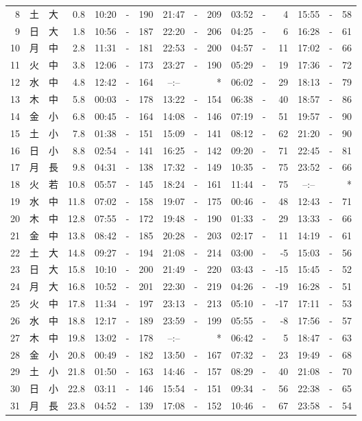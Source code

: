 \documentclass[12pt.a4j]{jsarticle}
\begin{document}
\begin{center}
\begin{table}[ht]
\begin{tabular}{|rc|cr|ccrccr|ccrccr|}
 8 & 土 & 大 &  0.8 & 10:20 &-& 190 & 21:47 &-& 209 & 03:52 &-&   4 & 15:55 &-&  58 \\
 9 & 日 & 大 &  1.8 & 10:56 &-& 187 & 22:20 &-& 206 & 04:25 &-&   6 & 16:28 &-&  61 \\
10 & 月 & 中 &  2.8 & 11:31 &-& 181 & 22:53 &-& 200 & 04:57 &-&  11 & 17:02 &-&  66 \\
11 & 火 & 中 &  3.8 & 12:06 &-& 173 & 23:27 &-& 190 & 05:29 &-&  19 & 17:36 &-&  72 \\
12 & 水 & 中 &  4.8 & 12:42 &-& 164 & --:-- & &  *  & 06:02 &-&  29 & 18:13 &-&  79 \\
13 & 木 & 中 &  5.8 & 00:03 &-& 178 & 13:22 &-& 154 & 06:38 &-&  40 & 18:57 &-&  86 \\
14 & 金 & 小 &  6.8 & 00:45 &-& 164 & 14:08 &-& 146 & 07:19 &-&  51 & 19:57 &-&  90 \\
15 & 土 & 小 &  7.8 & 01:38 &-& 151 & 15:09 &-& 141 & 08:12 &-&  62 & 21:20 &-&  90 \\
16 & 日 & 小 &  8.8 & 02:54 &-& 141 & 16:25 &-& 142 & 09:20 &-&  71 & 22:45 &-&  81 \\
17 & 月 & 長 &  9.8 & 04:31 &-& 138 & 17:32 &-& 149 & 10:35 &-&  75 & 23:52 &-&  66 \\
18 & 火 & 若 & 10.8 & 05:57 &-& 145 & 18:24 &-& 161 & 11:44 &-&  75 & --:-- & &  *  \\
19 & 水 & 中 & 11.8 & 07:02 &-& 158 & 19:07 &-& 175 & 00:46 &-&  48 & 12:43 &-&  71 \\
20 & 木 & 中 & 12.8 & 07:55 &-& 172 & 19:48 &-& 190 & 01:33 &-&  29 & 13:33 &-&  66 \\
21 & 金 & 中 & 13.8 & 08:42 &-& 185 & 20:28 &-& 203 & 02:17 &-&  11 & 14:19 &-&  61 \\
22 & 土 & 大 & 14.8 & 09:27 &-& 194 & 21:08 &-& 214 & 03:00 &-&  -5 & 15:03 &-&  56 \\
23 & 日 & 大 & 15.8 & 10:10 &-& 200 & 21:49 &-& 220 & 03:43 &-& -15 & 15:45 &-&  52 \\
24 & 月 & 大 & 16.8 & 10:52 &-& 201 & 22:30 &-& 219 & 04:26 &-& -19 & 16:28 &-&  51 \\
25 & 火 & 中 & 17.8 & 11:34 &-& 197 & 23:13 &-& 213 & 05:10 &-& -17 & 17:11 &-&  53 \\
26 & 水 & 中 & 18.8 & 12:17 &-& 189 & 23:59 &-& 199 & 05:55 &-&  -8 & 17:56 &-&  57 \\
27 & 木 & 中 & 19.8 & 13:02 &-& 178 & --:-- & &  *  & 06:42 &-&   5 & 18:47 &-&  63 \\
28 & 金 & 小 & 20.8 & 00:49 &-& 182 & 13:50 &-& 167 & 07:32 &-&  23 & 19:49 &-&  68 \\
29 & 土 & 小 & 21.8 & 01:50 &-& 163 & 14:46 &-& 157 & 08:29 &-&  40 & 21:08 &-&  70 \\
30 & 日 & 小 & 22.8 & 03:11 &-& 146 & 15:54 &-& 151 & 09:34 &-&  56 & 22:38 &-&  65 \\
31 & 月 & 長 & 23.8 & 04:52 &-& 139 & 17:08 &-& 152 & 10:46 &-&  67 & 23:58 &-&  54 \\
\hline
\end{tabular}
\end{table}
\newpage
\end{center}
\end{document}
